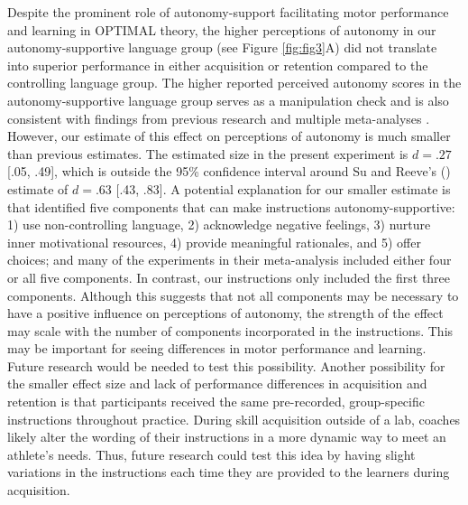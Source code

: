 \documentclass[doc,floatsintext,donotrepeattitle,letterpaper,12pt]{apa7}
\begin{document}
Despite the prominent role of autonomy-support facilitating motor performance and learning in OPTIMAL theory, the higher perceptions of autonomy in our autonomy-supportive language group (see Figure \ref{fig:fig3}A) did not translate into superior performance in either acquisition or retention compared to the controlling language group. The higher reported perceived autonomy scores in the autonomy-supportive language group serves as a manipulation check and is also consistent with findings from previous research \autocite[e.g.,][]{reeve2011} and multiple meta-analyses \autocite[e.g.,][]{mossman2022,ng2012,okada2021,su2011}. However, our estimate of this effect on perceptions of autonomy is much smaller than previous estimates. The estimated size in the present experiment is $d = .27$ [.05, .49], which is outside the 95\% confidence interval around Su and Reeve's (\citeyear{su2011}) estimate of $d = .63$ [.43, .83]. A potential explanation for our smaller estimate is that \textcite{su2011} identified five components that can make instructions autonomy-supportive: 1) use non-controlling language, 2) acknowledge negative feelings, 3) nurture inner motivational resources, 4) provide meaningful rationales, and 5) offer choices; and many of the experiments in their meta-analysis included either four or all five components. In contrast, our instructions only included the first three components. Although this suggests that not all components may be necessary to have a positive influence on perceptions of autonomy, the strength of the effect may scale with the number of components incorporated in the instructions. This may be important for seeing differences in motor performance and learning. Future research would be needed to test this possibility. Another possibility for the smaller effect size and lack of performance differences in acquisition and retention is that participants received the same pre-recorded, group-specific instructions throughout practice. During skill acquisition outside of a lab, coaches likely alter the wording of their instructions in a more dynamic way to meet an athlete's needs. Thus, future research could test this idea by having slight variations in the instructions each time they are provided to the learners during acquisition.
\end{document}
